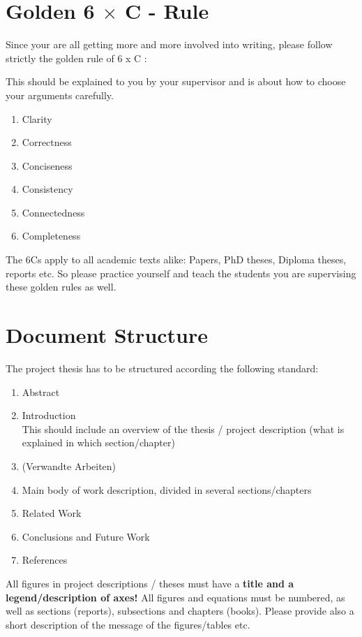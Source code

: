 \section{Golden 6 \texorpdfstring{$\times$}{x} C - Rule}

Since your are all getting more and more involved into writing,
please follow strictly the golden rule of 6 x C :

This should be explained to you by your supervisor and is about
how to choose your arguments carefully.

\begin{enumerate}
\item Clarity
\item Correctness
\item Conciseness
\item Consistency
\item Connectedness
\item Completeness
\end{enumerate}

The 6Cs apply to all academic texts alike: Papers, PhD theses, Diploma theses, reports etc.
So please practice yourself and teach the students you are supervising these golden rules
as well.


\section{Document Structure}

The project thesis has to be structured according the following standard:

\begin{enumerate}
\item Abstract
\item Introduction\\
This should include an overview of the thesis / project description
(what is explained in which section/chapter)
\item (Verwandte Arbeiten)
\item Main body of work description, divided in several sections/chapters 
\item Related Work
\item Conclusions and Future Work
\item References
\end{enumerate}

All figures in project descriptions / theses must have a \textbf{title and a legend/description of axes!}
All figures and equations must be numbered, as well as sections (reports),
subsections and chapters (books). Please provide also a short description of the message of the figures/tables etc.

